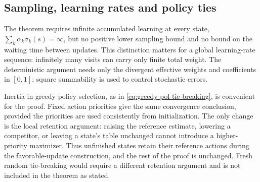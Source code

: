 \documentclass[twoside,11pt]{article}
\newcommand{\update}{\mu}
\newcommand{\discount}{\gamma}
\newcommand{\lrate}{\alpha}
\DeclareRobustCommand{\reviewbarstart}{%
  \ifhmode %
    \vadjust{\vbox to 0pt{%
      \vskip-\ht\strutbox %
      \vskip-\dp\strutbox %
      \cbstart[\changebarwidth] %
      \vss %
    }}%
  \else %
    \cbstart[\changebarwidth]%
  \fi %
} %
\providecommand{\DIFadd}[1]{#1} %
\providecommand{\DIFaddbegin}{\reviewbarstart} %
\providecommand{\DIFaddend}{\protect\cbend} %
\def\DIFadd#1{#1}%
\def\DIFaddbegin{}%
\def\DIFaddend{}%
\begin{document}



\subsection{ \DIFaddbegin \DIFadd{Sampling, learning rates and policy ties}\DIFaddend }
\label{sec: relaxing conditions}
\DIFaddbegin \DIFadd{The theorem requires infinite accumulated learning at every state, $\sum_k\alpha_k\sigma_k(s)=\infty$, but no positive lower sampling bound and no bound on the waiting time between updates. This distinction matters for a global learning-rate sequence: infinitely many visits can carry only finite total weight. The deterministic argument needs only the divergent effective weights and coefficients in $[0,1]$; square summability is used to control stochastic errors.
}\DIFaddend 

 \DIFaddbegin \DIFadd{Inertia in greedy policy selection, as }\DIFaddend in \eqref{eq:greedy-pol-tie-breaking},  \DIFaddbegin \DIFadd{is convenient for the proof. Fixed action priorities give the same convergence conclusion, provided the priorities are used consistently from initialization. The only change is the local retention argument: raising the reference estimate, lowering a competitor, or leaving a state's table unchanged cannot introduce a higher-priority maximizer. Thus unfinished states retain their reference actions during the favorable-update construction}\DIFaddend , and the  \DIFaddbegin \DIFadd{rest of the proof is unchanged. Fresh random tie-breaking would require a different retention argument and is not included in the theorem as stated.
}\DIFaddend 
\end{document}
